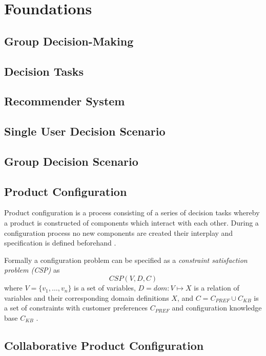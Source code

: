 \chapter{Foundations}
\label{ch:Foundations}

\section{Group Decision-Making}
\label{sec:Foundation:GroupDecisionMaking}

\section{Decision Tasks}
\label{sec:Foundation:DecisionTask}

\section{Recommender System}
\label{sec:Foundation:RecommenderSystem}

\section{Single User Decision Scenario}
\label{sec:Foundation:SingleUserDecisionScenario}

\section{Group Decision Scenario}
\label{sec:Foundation:GroupDecisionScenario}

\section{Product Configuration}
\label{sec:Foundation:ProductConfiguration}

Product configuration is a process consisting of a series of decision tasks whereby a product is constructed of components which interact with each other. During a configuration process no new components are created their interplay and specification is defined beforehand \cite[~ p. 42-43]{sabinProductConfigurationFrameworksa1998}.

Formally a configuration problem can be specified as a \emph{constraint satisfaction problem (CSP)} \cite{tsangFoundationsConstraintSatisfaction1993} as 
\[
    CSP(V,D,C)
\]
where \( V = \{v_1,\dots, v_n\} \) is a set of variables, \( D = dom : V \mapsto X \) is a relation of variables and their corresponding domain definitions \( X \), and \( C = C_{PREF} \cup C_{KB} \) is a set of constraints with customer preferences \( C_{PREF} \) and configuration knowledge base \( C_{KB} \) \cite{felfernigOpenConfiguration2014, felferningGroupBasedConfiguration2016}.

\section{Collaborative Product Configuration}
\label{sec:Foundation:CollaborativeProductConfiguration}

